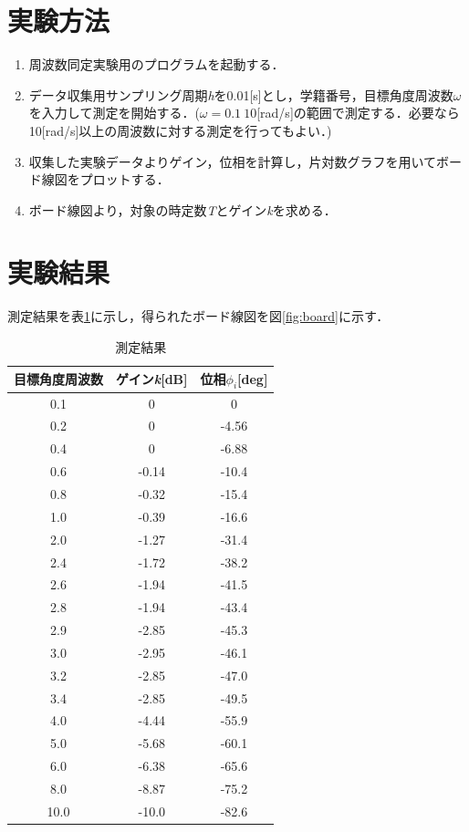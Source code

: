 \documentclass{jsarticle}
\begin{document}
 \section{実験方法}
 \begin{enumerate}
  \item 周波数同定実験用のプログラムを起動する．
  \item データ収集用サンプリング周期{\it h}を0.01[s]とし，学籍番号，目標角度周波数$\omega$を入力して測定を開始する．($\omega = 0.1 ~ 10$[rad/s]の範囲で測定する．必要なら10[rad/s]以上の周波数に対する測定を行ってもよい．)
  \item 収集した実験データよりゲイン，位相を計算し，片対数グラフを用いてボード線図をプロットする．
  \item ボード線図より，対象の時定数{\it T}とゲイン{\it k}を求める．
 \end{enumerate}
 
\section{実験結果}
測定結果を表\ref{tab:table1}に示し，得られたボード線図を図\ref{fig:board}に示す．\\
\begin{table}[hb]
 \begin{center}
  \caption{測定結果}
  \begin{tabular}{|c|c|c|} \hline
   目標角度周波数 & ゲイン{\it k}[dB] & 位相$\phi_i$[deg]\\ \hline \hline
   0.1 & 0 & 0 \\ \hline
   0.2 & 0 & -4.56 \\ \hline
   0.4 & 0 & -6.88 \\ \hline
   0.6 & -0.14 & -10.4 \\ \hline
   0.8 & -0.32 & -15.4 \\ \hline
   1.0 & -0.39 & -16.6 \\ \hline
   2.0 & -1.27 & -31.4 \\ \hline
   2.4 & -1.72 & -38.2 \\ \hline
   2.6 & -1.94 & -41.5 \\ \hline
   2.8 & -1.94 & -43.4 \\ \hline
   2.9 & -2.85 & -45.3 \\ \hline
   3.0 & -2.95 & -46.1 \\ \hline
   3.2 & -2.85 & -47.0 \\ \hline
   3.4 & -2.85 & -49.5 \\ \hline
   4.0 & -4.44 & -55.9 \\ \hline
   5.0 & -5.68 & -60.1 \\ \hline
   6.0 & -6.38 & -65.6 \\ \hline
   8.0 & -8.87 & -75.2 \\ \hline
   10.0 & -10.0 & -82.6 \\ \hline
  \end{tabular}
  \label{tab:table1}
 \end{center}
\end{table}
\end{document}
